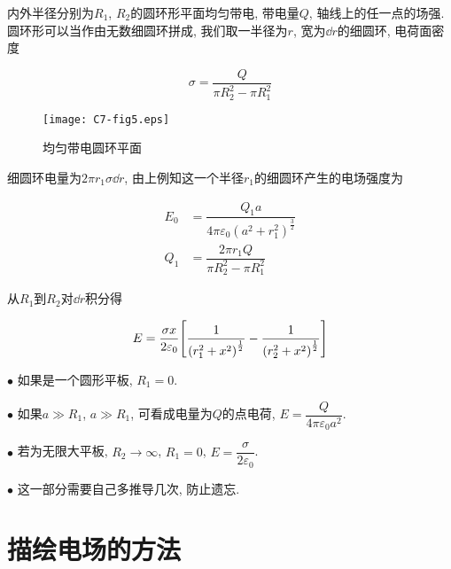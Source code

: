 \vskip 0.3cm

\begin{example}
	内外半径分别为$R_1$, $R_2$的圆环形平面均匀带电, 带电量$Q$, 轴线上的任一点的场强. 圆环形可以当作由无数细圆环拼成, 我们取一半径为$r$, 宽为$\dd{r}$的细圆环, 电荷面密度
	
	\begin{equation*}
		\sigma = \dfrac{Q}{\pi R_2^2 - \pi R_1^2}
	\end{equation*}
	
	\begin{figure}[h]
		\centering
		\texttt{[image: C7-fig5.eps]}
		\caption{均匀带电圆环平面}
	\end{figure}
	
	细圆环电量为$2\pi r_1 \sigma \dd{r}$, 由上例知这一个半径$r_1$的细圆环产生的电场强度为
	
	\begin{align*}
		E_0 &= \dfrac{Q_1 a}{4 \pi \varepsilon_0 {(a^2 + r_1^2)}^{{\frac{3}{2}}}} \\
		Q_1 &= \dfrac{2\pi r_1Q}{\pi R_2^2 - \pi R_1^2}
	\end{align*}
	
	从$R_1$到$R_2$对$\dd{r}$积分得
	
	\begin{equation*}
		E = \dfrac{\sigma x}{2 \varepsilon_0}\qty[\dfrac{1}{{(r_1^2 + x^2)}^{{\frac{1}{2}}}} - \dfrac{1}{{(r_2^2 + x^2)}^{{\frac{1}{2}}}}]
	\end{equation*}
	
\end{example}

\begin{note}
	
	$\bullet$ 如果是一个圆形平板, $R_1=0$. 
	
	$\bullet$ 如果$a\gg R_1$, $a\gg R_1$, 可看成电量为$Q$的点电荷, $E = \dfrac{Q}{4 \pi \varepsilon_0 a^2}$.
	
	$\bullet$ 若为无限大平板, $R_2 \rightarrow \infty$, $R_1=0$, $E = \dfrac{\sigma}{2\varepsilon_0}$.
	
	\vskip 0.2cm
	
	$\bullet$ 这一部分需要自己多推导几次, 防止遗忘. 
	
\end{note}

\section{描绘电场的方法} \label{7.2}

